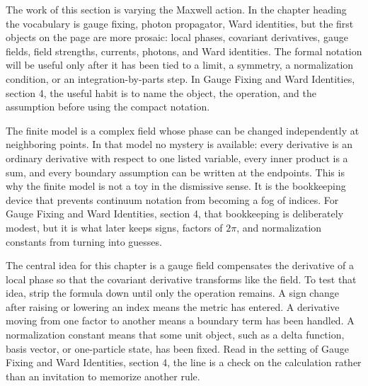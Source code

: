 











The work of this section is varying the Maxwell action.  In the chapter heading the vocabulary is gauge fixing, photon propagator, Ward identities, but the first objects on the page are more prosaic: local phases, covariant derivatives, gauge fields, field strengths, currents, photons, and Ward identities.  The formal notation will be useful only after it has been tied to a limit, a symmetry, a normalization condition, or an integration-by-parts step.  In Gauge Fixing and Ward Identities, section 4, the useful habit is to name the object, the operation, and the assumption before using the compact notation.

The finite model is a complex field whose phase can be changed independently at neighboring points.  In that model no mystery is available: every derivative is an ordinary derivative with respect to one listed variable, every inner product is a sum, and every boundary assumption can be written at the endpoints.  This is why the finite model is not a toy in the dismissive sense.  It is the bookkeeping device that prevents continuum notation from becoming a fog of indices.  For Gauge Fixing and Ward Identities, section 4, that bookkeeping is deliberately modest, but it is what later keeps signs, factors of \(2\pi\), and normalization constants from turning into guesses.

The central idea for this chapter is a gauge field compensates the derivative of a local phase so that the covariant derivative transforms like the field.  To test that idea, strip the formula down until only the operation remains.  A sign change after raising or lowering an index means the metric has entered.  A derivative moving from one factor to another means a boundary term has been handled.  A normalization constant means that some unit object, such as a delta function, basis vector, or one-particle state, has been fixed.  Read in the setting of Gauge Fixing and Ward Identities, section 4, the line is a check on the calculation rather than an invitation to memorize another rule.

